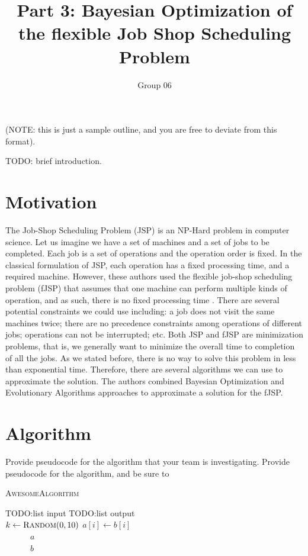 \documentclass[11pt]{article}
\title{Part 3: Bayesian Optimization of the flexible Job Shop Scheduling Problem}
\author{Group 06} \\
\begin{document}
\maketitle

(NOTE: this is just a sample outline, and you are free to deviate from this 
format).

TODO: brief introduction.

\section{Motivation}
The Job-Shop Scheduling Problem (JSP) is an NP-Hard problem in computer science\cite{cheng1996tutorial}. Let us imagine we have a set of machines and a set of jobs to be completed. Each job is a set of operations and the operation order is fixed. In the classical formulation of JSP, each operation has a fixed processing time, and a required machine. However, these authors used the flexible job-shop scheduling problem (fJSP) that assumes that one machine can perform multiple kinds of operation, and as such, there is no fixed processing time \cite{sun2015bayesian}. There are several potential constraints we could use including: a job does not visit the same machines twice; there are no precedence constraints among operations of different jobs; operations can not be interrupted; etc. Both JSP and fJSP are minimization problems, that is, we generally want to minimize the overall time to completion of all the jobs. As we stated before, there is no way to solve this problem in less than exponential time. Therefore, there are several algorithms we can use to approximate the solution. The authors combined Bayesian Optimization and Evolutionary Algorithms approaches to approximate a solution for the fJSP. 

\section{Algorithm}
Provide pseudocode for the algorithm that your team is investigating.  Provide 
pseudocode for the algorithm, and be sure to 

\begin{algorithm}\caption{\textsc{AwesomeAlgorithm}}
 \begin{algorithmic}[1]
    TODO:list input
    TODO:list output\\
   
   \State $k \gets \textsc{Random}(0,10)$
	\State $a[i] \gets b[i]$
        \EndWhile\\
~~~~~~\Return $a$
   \Else\\
   ~~~~~~\Return $b$
   \EndIf
 \end{algorithmic}
\end{algorithm}
\end{document}
